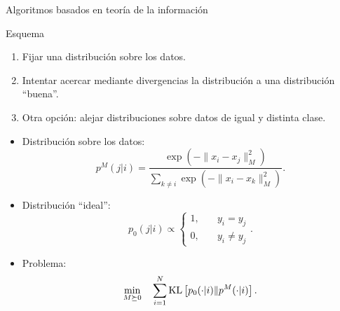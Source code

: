 \documentclass[10pt, compress]{beamer}
\begin{document}
\begin{frame}[shrink]{Algoritmos basados en teoría de la información}
  \begin{block}{Esquema}
    \begin{enumerate}
      \item Fijar una distribución sobre los datos.
      \item Intentar acercar mediante divergencias la distribución a una distribución ``buena''.
      \item Otra opción: alejar distribuciones sobre datos de igual y distinta clase.
    \end{enumerate}
  \end{block}

  \begin{example}[MCML]
    \begin{itemize}
      \item Distribución sobre los datos:
      \[ p^M(j|i) = \frac{\exp(-\|x_i - x_j\|_M^2)}{\sum\limits_{k \ne i}{\exp(-\|x_i - x_k\|^2_M)}}. \]
      \item Distribución ``ideal'':
      \[p_0(j|i) \propto \begin{cases}1, &\quad y_i = y_j \\ 0, &\quad y_i \ne y_j\end{cases}. \]
      \item Problema:
      \[\min_{M \succeq 0}\quad \sum_{i=1}^N \operatorname{KL} \left[ p_0(\cdot|i) \| p^M(\cdot|i) \right]. \]
    \end{itemize}
  \end{example}
\end{frame}
\end{document}
